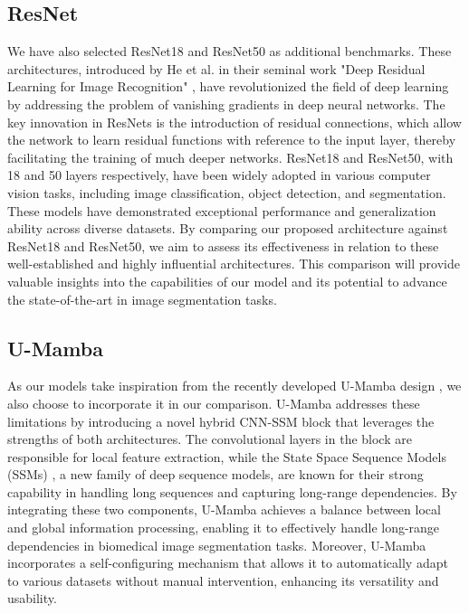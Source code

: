 \documentclass[conference]{IEEEtran}
\begin{document}
\subsection{ResNet}
We have also selected ResNet18 and ResNet50 as additional benchmarks. These architectures, introduced by He et al. in their seminal work "Deep Residual Learning for Image Recognition" \cite{he2015deep}, have revolutionized the field of deep learning by addressing the problem of vanishing gradients in deep neural networks. The key innovation in ResNets is the introduction of residual connections, which allow the network to learn residual functions with reference to the input layer, thereby facilitating the training of much deeper networks. ResNet18 and ResNet50, with 18 and 50 layers respectively, have been widely adopted in various computer vision tasks, including image classification, object detection, and segmentation. These models have demonstrated exceptional performance and generalization ability across diverse datasets. By comparing our proposed architecture against ResNet18 and ResNet50, we aim to assess its effectiveness in relation to these well-established and highly influential architectures. This comparison will provide valuable insights into the capabilities of our model and its potential to advance the state-of-the-art in image segmentation tasks.
\subsection{U-Mamba}
As our models take inspiration from the recently developed U-Mamba design \cite{ma2024umamba}, we also choose to incorporate it in our comparison. U-Mamba addresses these limitations by introducing a novel hybrid CNN-SSM block that leverages the strengths of both architectures. The convolutional layers in the block are responsible for local feature extraction, while the State Space Sequence Models (SSMs) \cite{gu2022efficiently}, a new family of deep sequence models, are known for their strong capability in handling long sequences and capturing long-range dependencies. By integrating these two components, U-Mamba achieves a balance between local and global information processing, enabling it to effectively handle long-range dependencies in biomedical image segmentation tasks. Moreover, U-Mamba incorporates a self-configuring mechanism that allows it to automatically adapt to various datasets without manual intervention, enhancing its versatility and usability.
\end{document}
